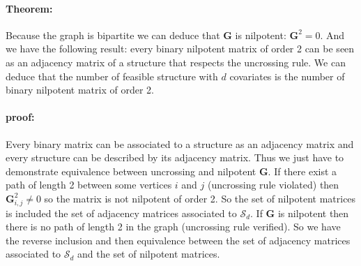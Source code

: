 \documentclass[12pt,a4paper]{report}
\begin{document}
	\paragraph{Theorem:} Because the graph is bipartite we can deduce that $\boldsymbol{G}$ is nilpotent: $\boldsymbol{G}^2=0$. And we have the following result: every binary nilpotent matrix of order 2 can be seen as an adjacency matrix of a structure that respects the uncrossing rule. We can deduce that the number of feasible structure with $d$ covariates is the number of binary nilpotent matrix of order 2. \\
	 
	\paragraph{proof:} Every binary matrix can be associated to a structure as an adjacency matrix and every structure can be described by its adjacency matrix. Thus we just have to demonstrate equivalence between uncrossing and nilpotent $\boldsymbol{G}$. If there exist a path of length 2 between some vertices $i$ and $j$ (uncrossing rule violated) then $\boldsymbol{G}^2_{i,j}\neq 0$ so the matrix is not nilpotent of order 2. So the set of nilpotent matrices is included the set of adjacency matrices associated to $\mathcal{S}_d$. If $\boldsymbol{G}$ is nilpotent then there is no path of length 2 in the graph (uncrossing rule verified). So we have the reverse inclusion and then equivalence between the set of adjacency matrices associated to $\mathcal{S}_d$ and the set of nilpotent matrices.\\
	
\end{document}
